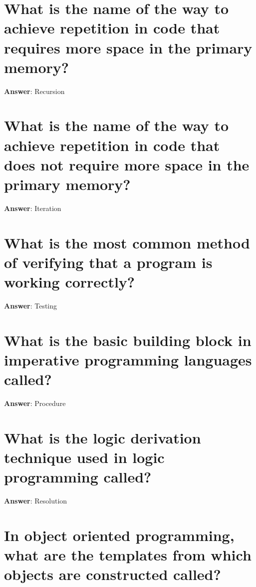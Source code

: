 \documentclass[a4paper,11pt,oneside]{book}
\begin{document}
\begin{sloppypar}
\section{What is the name of the way to achieve repetition in code that requires more space in the primary memory?}

\label{q:31:sa:en:True}

\textbf{Answer}: Recursion



\section{What is the name of the way to achieve repetition in code that does not require more space in the primary memory?}

\label{q:32:sa:en:True}

\textbf{Answer}: Iteration



\section{What is the most common method of verifying that a program is working correctly?}

\label{q:33:sa:en:True}

\textbf{Answer}: Testing



\section{What is the basic building block in imperative programming languages called?}

\label{q:34:sa:en:True}

\textbf{Answer}: Procedure



\section{What is the logic derivation technique used in logic programming called?}

\label{q:35:sa:en:True}

\textbf{Answer}: Resolution



\section{In object oriented programming, what are the templates from which objects are constructed called?}


\end{sloppypar}
\end{document}
